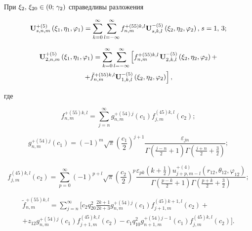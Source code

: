 \begin{theorem}
При ${\xi _2},{\mkern 1mu} {\kern 1pt} {\xi _{20}} \in (0;{\mkern 1mu} {\kern 1pt} {\gamma _2})$ справедливы разложения

\begin{equation}\label{eq:1:46}
{\bf{U}}_{s,n,m}^{ + (5)}\left( {{\xi _1},{\eta _1},{\varphi _1}} \right) = \sum\limits_{k = 0}^\infty  {\sum\limits_{l =  - \infty }^\infty  {f_{n,m}^{ + (55)k,l}} } {\bf{U}}_{s,k,l}^{ - (5)}\left( {{\xi _2},{\eta _2},{\varphi _2}} \right), {\kern 1pt} s = 1,{\mkern 1mu} {\kern 1pt} 3;
\end{equation}

\begin{multline}\label{eq:1:47}
{\bf{U}}_{2,n,m}^{ + (5)}\left( {{\xi _1},{\eta _1},{\varphi _1}} \right) = \sum\limits_{k = 0}^\infty  {\sum\limits_{l =  - \infty }^\infty  {\left[ {f_{n,m}^{ + (55)k,l}} \right.} } {\bf{U}}_{2,k,l}^{ - (5)}\left( {{\xi _2},{\eta _2},{\varphi _2}} \right) + \\
\left. { + \tilde f_{n,m}^{ + (55)k,l}{\bf{U}}_{1,k,l}^{ - (5)}\left( {{\xi _2},{\eta _2},{\varphi _2}} \right)} \right],
\end{multline}

\noindent где

\begin{equation}\label{eq:1:48}
f_{n,m}^{ + (55)k,l} = \sum\limits_{j = n}^\infty  {g_{n,m}^{ + (54)j}} ({c_1})f_{j,m}^{(45)k,l}({c_2});
\end{equation}

\begin{equation}\label{eq:1:49}
g_{n,m}^{ + (54)j}({c_1}) = {( - 1)^m}\sqrt \pi  {\left( {\frac{{{c_1}}}{2}} \right)^{j + 1}}\frac{{{\varepsilon _{jn}}}}{{\Gamma \left( {\frac{{j - n}}{2} + 1} \right)\Gamma \left( {\frac{{j + n}}{2} + \frac{3}{2}} \right)}};
\end{equation}

\begin{equation}\label{eq:1:50}
f_{j,m}^{(45)k,l}({c_2}) = \sum\limits_{p = 0}^\infty  {{{( - 1)}^{p + l}}} \sqrt \pi  {\left( {\frac{{{c_2}}}{2}} \right)^p}\frac{{{\varepsilon _{pk}}\left( {k + \frac{1}{2}} \right)u_{j + p,m - l}^{ + (4)}\left( {{r_{12}},{\theta _{12}},{\varphi _{12}}} \right)}}{{\Gamma \left( {\frac{{p - k}}{2} + 1} \right)\Gamma \left( {\frac{{p + k}}{2} + \frac{3}{2}} \right)}};
\end{equation}

\begin{multline}\label{eq:1:51}
\tilde f_{n,m}^{ + (55)k,l} = \sum\limits_{j = n}^\infty \bigg[ {c_2}q_{20}^2\frac{{2k + 1}}{{2k + 3}}g_{n,m}^{ + (54)j}({c_1})f_{j + 1,m}^{(45)k + 1,l}({c_2}) + \\
+ {z_{12}}g_{n,m}^{ + (54)j}({c_1})f_{j + 1,m}^{(45)k,l}({c_2}) - {{c_1}q_{10}^2g_{n + 1,m}^{ + (54)j - 1}({c_1})f_{j,m}^{(45)k,l}({c_2})} \bigg].
\end{multline}


\end{theorem}
